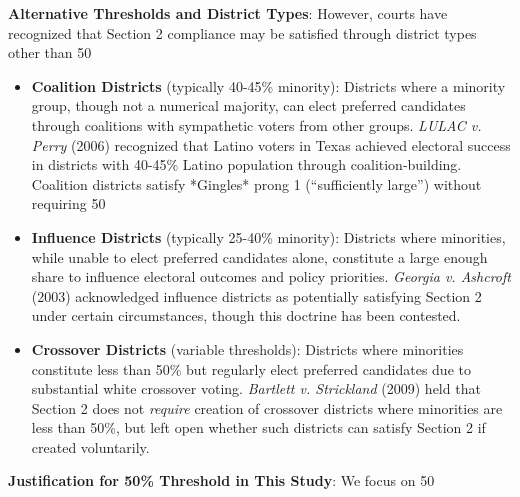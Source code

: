 \textbf{Alternative Thresholds and District Types}: However, courts have recognized that Section 2 compliance may be satisfied through district types other than 50%

\begin{itemize}
    \item \textbf{Coalition Districts} (typically 40-45\% minority): Districts where a minority group, though not a numerical majority, can elect preferred candidates through coalitions with sympathetic voters from other groups. \emph{LULAC v. Perry} (2006) recognized that Latino voters in Texas achieved electoral success in districts with 40-45\% Latino population through coalition-building. Coalition districts satisfy *Gingles* prong 1 (``sufficiently large'') without requiring 50%

    \item \textbf{Influence Districts} (typically 25-40\% minority): Districts where minorities, while unable to elect preferred candidates alone, constitute a large enough share to influence electoral outcomes and policy priorities. \emph{Georgia v. Ashcroft} (2003) acknowledged influence districts as potentially satisfying Section 2 under certain circumstances, though this doctrine has been contested.

    \item \textbf{Crossover Districts} (variable thresholds): Districts where minorities constitute less than 50\% but regularly elect preferred candidates due to substantial white crossover voting. \emph{Bartlett v. Strickland} (2009) held that Section 2 does not \emph{require} creation of crossover districts where minorities are less than 50\%, but left open whether such districts can satisfy Section 2 if created voluntarily.
\end{itemize}

\textbf{Justification for 50\% Threshold in This Study}: We focus on 50%

